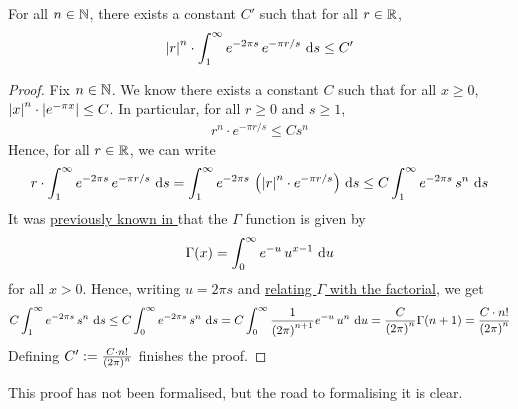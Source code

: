 \begin{boxlemma}\label{Ch4:Lemma:Bessel_Bound}
    For all $n \in \mathbb{N}$, there exists a constant $C'$ such that for all $r \in \mathbb{R}$,
    \begin{align*}
        \left\lvert r \right\rvert^n \cdot \int_{1}^{\infty} e^{-2\pi s} \, e^{-\pi r /s} \, \operatorname{d}\!{s} \leq C'
    \end{align*}
\end{boxlemma}
\begin{proof}
    Fix $n \in \mathbb{N}$. We know there exists a constant $C$ such that for all $x \geq 0$, $\left\lvert x \right\rvert^n \cdot \left\lvert e^{-\pi x} \right\rvert \leq C$. In particular, for all $r \geq 0$ and $s \geq 1$,
    \begin{align*}
        r^n \cdot e^{-\pi r/s} \leq C s^n
    \end{align*}
    Hence, for all $r \in \mathbb{R}$, we can write
    \begin{align*}
        r \cdot \int_{1}^{\infty} e^{-2\pi s} \, e^{-\pi r /s} \, \operatorname{d}\!{s}
        = \int_{1}^{\infty} e^{-2\pi s} \, \left( \left\lvert r \right\rvert^n \cdot e^{-\pi r /s} \right) \, \operatorname{d}\!{s}
        \leq C \int_{1}^{\infty} e^{-2\pi s} \, s^n \, \operatorname{d}\!{s}
    \end{align*}
    It was \href{https://github.com/leanprover-community/mathlib4/blob/5a2eaa85c555c4263e15928cef249cbaad2eb2d2/Mathlib/Analysis/SpecialFunctions/Gamma/Basic.lean#L403}{previously known in \mathlib} that the $\Gamma$ function is given by
    \begin{align*}
        \Gamma(x) = \int_{0}^{\infty} e^{-u} \, u^{x-1} \, \operatorname{d}\!{u}
    \end{align*}
    for all $x > 0$. Hence, writing $u = 2\pi s$ and \href{https://github.com/leanprover-community/mathlib4/blob/5a2eaa85c555c4263e15928cef249cbaad2eb2d2/Mathlib/Analysis/SpecialFunctions/Gamma/Basic.lean#L430}{relating $\Gamma$ with the factorial}, we get
    \begin{align*}
        C \int_{1}^{\infty} e^{-2\pi s} \, s^n \, \operatorname{d}\!{s}
        \leq C \int_{0}^{\infty} e^{-2\pi s} \, s^n \, \operatorname{d}\!{s}
        = C \int_{0}^{\infty} \frac{1}{\left( 2\pi \right)^{n+1}} e^{-u} \, u^n \, \operatorname{d}\!{u}
        = \frac{C}{\left( 2\pi \right)^n} \Gamma\!\left( n + 1 \right)
        = \frac{C \cdot n!}{\left( 2\pi \right)^n}
    \end{align*}
    Defining $C' := \frac{C \cdot n!}{\left( 2\pi \right)^n}$ finishes the proof.
\end{proof}

This proof has not been formalised, but the road to formalising it is clear.

